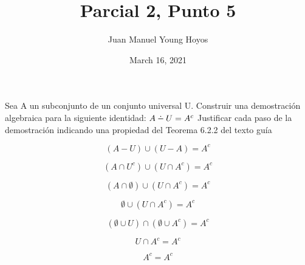 \documentclass[12pt, letterpaper, twoside]{article}
\title{Parcial 2, Punto 5}
\author{Juan Manuel Young Hoyos}
\date{March 16, 2021}
\providecommand{\dotminus}{\mathbin{\mathpalette\xdotminus\relax}}
\newcommand{\xdotminus}[2]{%
  \ooalign{\hidewidth$\vcenter{\hbox{$#1\dot{}$}}$\hidewidth\cr$#1-$\cr}%
}
\begin{document}
\maketitle

Sea A un subconjunto de un conjunto universal U. Construir una demostración algebraica para la siguiente identidad:
 $A \dotminus  U= A^c$
Justificar cada paso de la demostración indicando una propiedad del Teorema 6.2.2 del texto guía

\[ (A - U) \cup (U - A) = A^c \]

\[ (A \cap U^c) \cup (U \cap A^c) = A^c \]

\[ (A \cap \emptyset) \cup (U \cap A^c) = A^c \]

\[ \emptyset \cup (U \cap A^c) = A^c \]

\[ (\emptyset \cup U) \cap (\emptyset \cup A^c) = A^c \]

\[ U \cap  A^c = A^c \]

\[ A^c = A^c\]
\end{document}
